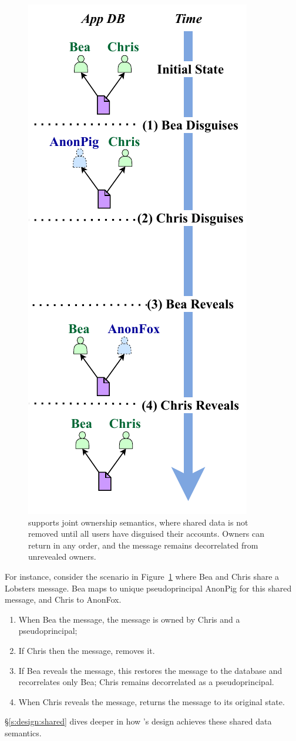 \begin{figure}
    \centering
    \includegraphics[width=.4\textwidth]{figs/shared_hl}
    \caption[\sys supports joint ownership semantics when disguising shared data.]{\sys supports joint ownership semantics, where shared data is not
    removed until all users have disguised their accounts. Owners can return in
    any order, and the message remains decorrelated from unrevealed owners.}
\label{f:shared:hl}
\end{figure}

%
For instance, consider the scenario in Figure~\ref{f:shared:hl} where Bea and
Chris share a Lobsters message. Bea maps to unique pseudoprincipal AnonPig for this
shared message, and Chris to AnonFox.
\begin{enumerate}[nosep]
    \item[(1)] When Bea \xxs the message, the message is owned by
Chris and a pseudoprincipal;
    \item[(2)] If Chris then \xxs the message, \sys removes it.
    \item[(3)] If Bea reveals the message, this restores the message to the database
and recorrelates only Bea; Chris remains decorrelated as a pseudoprincipal.
\item[(4)] When Chris reveals the message, \sys returns
the message to its original state.
\end{enumerate}
%

\S\ref{s:design:shared} dives deeper in how \sys's design achieves these shared
data semantics.


